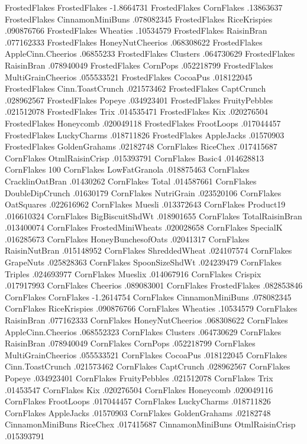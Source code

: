 FrostedFlakes	FrostedFlakes	-1.8664731
FrostedFlakes	CornFlakes	.13863637
FrostedFlakes	CinnamonMiniBuns	.078082345
FrostedFlakes	RiceKrispies	.090876766
FrostedFlakes	Wheaties	.10534579
FrostedFlakes	RaisinBran	.077162333
FrostedFlakes	HoneyNutCheerios	.068308622
FrostedFlakes	AppleCinn.Cheerios	.06855233
FrostedFlakes	Clusters	.064730629
FrostedFlakes	RaisinBran	.078940049
FrostedFlakes	CornPops	.052218799
FrostedFlakes	MultiGrainCheerios	.055533521
FrostedFlakes	CocoaPus	.018122045
FrostedFlakes	Cinn.ToastCrunch	.021573462
FrostedFlakes	CaptCrunch	.028962567
FrostedFlakes	Popeye	.034923401
FrostedFlakes	FruityPebbles	.021512078
FrostedFlakes	Trix	.014535471
FrostedFlakes	Kix	.020276504
FrostedFlakes	Honeycomb	.020049118
FrostedFlakes	FrootLoops	.017044457
FrostedFlakes	LuckyCharms	.018711826
FrostedFlakes	AppleJacks	.01570903
FrostedFlakes	GoldenGrahams	.02182748
CornFlakes	RiceChex	.017415687
CornFlakes	OtmlRaisinCrisp	.015393791
CornFlakes	Basic4	.014628813
CornFlakes	100%
CornFlakes	LowFatGranola	.018875463
CornFlakes	CracklinOatBran	.01430262
CornFlakes	Total	.014587661
CornFlakes	DoubleDipCrunch	.01630179
CornFlakes	NutriGrain	.023520106
CornFlakes	OatSquares	.022616962
CornFlakes	Muesli	.013372643
CornFlakes	Product19	.016610324
CornFlakes	BigBiscuitShdWt	.018901655
CornFlakes	TotalRaisinBran	.013400074
CornFlakes	FrostedMiniWheats	.020028658
CornFlakes	SpecialK	.016285673
CornFlakes	HoneyBunchesofOats	.02041317
CornFlakes	RaisinNutBran	.015148952
CornFlakes	ShreddedWheat	.024107574
CornFlakes	GrapeNuts	.025828363
CornFlakes	SpoonSizeShdWt	.024239479
CornFlakes	Triples	.024693977
CornFlakes	Mueslix	.014067916
CornFlakes	Crispix	.017917993
CornFlakes	Cheerios	.089083001
CornFlakes	FrostedFlakes	.082853846
CornFlakes	CornFlakes	-1.2614754
CornFlakes	CinnamonMiniBuns	.078082345
CornFlakes	RiceKrispies	.090876766
CornFlakes	Wheaties	.10534579
CornFlakes	RaisinBran	.077162333
CornFlakes	HoneyNutCheerios	.068308622
CornFlakes	AppleCinn.Cheerios	.068552323
CornFlakes	Clusters	.064730629
CornFlakes	RaisinBran	.078940049
CornFlakes	CornPops	.052218799
CornFlakes	MultiGrainCheerios	.055533521
CornFlakes	CocoaPus	.018122045
CornFlakes	Cinn.ToastCrunch	.021573462
CornFlakes	CaptCrunch	.028962567
CornFlakes	Popeye	.034923401
CornFlakes	FruityPebbles	.021512078
CornFlakes	Trix	.01453547
CornFlakes	Kix	.020276504
CornFlakes	Honeycomb	.020049116
CornFlakes	FrootLoops	.017044457
CornFlakes	LuckyCharms	.018711826
CornFlakes	AppleJacks	.01570903
CornFlakes	GoldenGrahams	.02182748
CinnamonMiniBuns	RiceChex	.017415687
CinnamonMiniBuns	OtmlRaisinCrisp	.015393791
